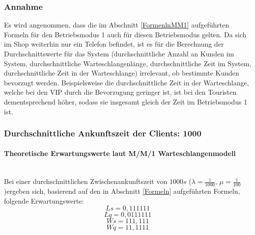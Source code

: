 \subsubsection{Annahme}
Es wird angenommen, dass die im Abschnitt \ref{FormenlnMM1} aufgeführten Formeln für den Betriebsmodus 1 auch für diesen Betriebsmodus gelten. Da sich im Shop weiterhin nur ein Telefon befindet, ist es für die Berechnung der Durchschnittswerte für das System (durchschnittliche Anzahl an Kunden im System, durchschnittliche Warteschlangenlänge, durchschnittliche Zeit im System, durchschnittliche Zeit in der Warteschlange) irrelevant, ob bestimmte Kunden bevorzugt werden. Beispielsweise die durchschnittliche Zeit in der Warteschlange, welche bei den VIP durch die Bevorzugung geringer ist, ist bei den Touristen dementsprechend höher, sodass sie insgesamt gleich der Zeit im Betriebsmodus 1 ist.
\subsubsection{Durchschnittliche Ankunftszeit der Clients: 1000}
\paragraph{Theoretische Erwartungswerte laut M/M/1 Warteschlangenmodell}
\\
Bei einer durchschnittlichen Zwischenankunftszeit von $1000s$ ($\lambda=\frac{1}{1000}$, $\mu=\frac{1}{100}$)ergeben sich, basierend auf den in Abschnitt \ref{Formeln} aufgeführten Formeln, folgende Erwartungswerte:
\begin{equation}
Ls=0,111111
\end{equation}
\begin{equation}
Lq=0,0111111
\end{equation}
\begin{equation}
Ws=111,111
\end{equation}
\begin{equation}
Wq=11,1111
\end{equation}
